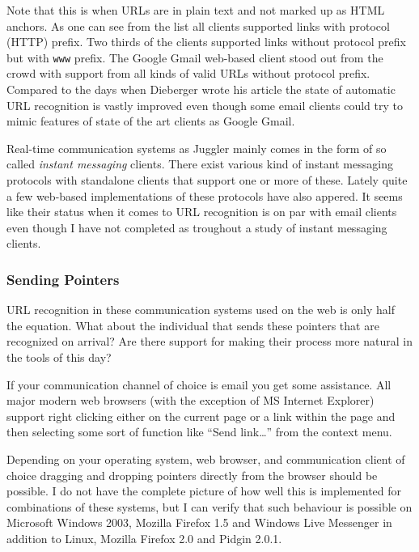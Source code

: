 \documentclass[12pt,a4paper]{article}
\begin{document}
Note that this is when URLs are in plain text and not marked up as
HTML anchors. As one can see from the list all clients supported links with
protocol (HTTP) prefix. Two thirds of the clients supported links without
protocol prefix but with \texttt{www} prefix. The Google Gmail web-based
client stood out from the crowd with support from all kinds of valid URLs
without protocol prefix. Compared to the days when Dieberger wrote his
article the state of automatic
URL recognition is vastly improved even though some email clients could try to
mimic features of state of the art clients as Google Gmail. 

Real-time communication systems as Juggler mainly comes in the form of so
called \emph{instant messaging} clients. There exist various kind of instant
messaging protocols with standalone clients that support one or more of these.
Lately quite a few web-based implementations of these protocols have also
appered. It seems like their status when it comes to URL recognition is on
par with email clients even though I have not completed as troughout a study
of instant messaging clients.


\subsubsection{Sending Pointers}

URL recognition in these communication systems used on the web is only half
the equation. What about the individual that sends these pointers that are
recognized on arrival? Are there support for making their process more natural
in the tools of this day?

If your communication channel of choice is email you get some assistance. All
major modern web browsers (with the exception of MS Internet Explorer)
support right clicking either on the current page or
a link within the page and then selecting some sort of function like ``Send
link\ldots'' from the context menu.

Depending on your operating system, web browser, and communication
client of choice dragging and dropping pointers directly from the browser
should be possible. I do not have the complete picture of how well this is
implemented for combinations of these systems, but I can verify that such
behaviour is possible on Microsoft Windows 2003, Mozilla Firefox 1.5 and
Windows Live Messenger in addition to Linux, Mozilla Firefox 2.0 and Pidgin
2.0.1.
\end{document}
